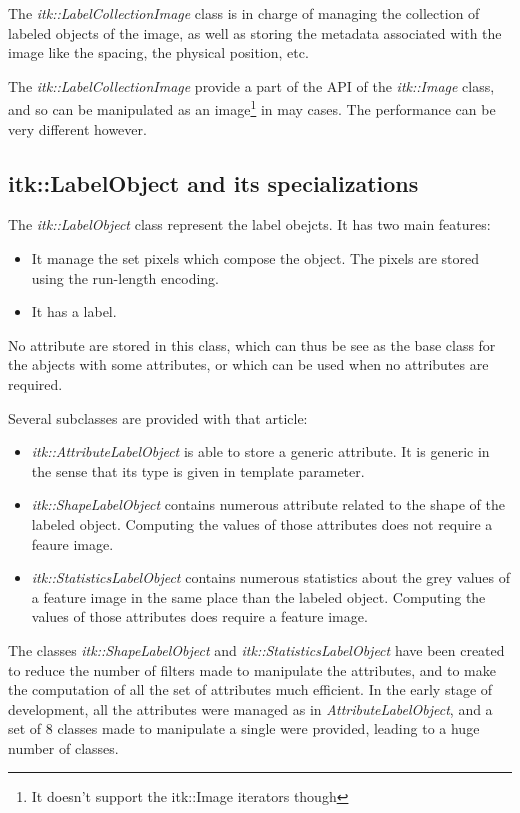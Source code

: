 \documentclass{InsightArticle}
\begin{document}
The {\em itk::LabelCollectionImage} class is in charge of managing the
collection of labeled
objects of the image, as well as storing the metadata associated with the image
like
the spacing, the physical position, etc.

The {\em itk::LabelCollectionImage} provide a part of the API of the {\em
itk::Image} class,
and so can be manipulated as an image\footnote{It doesn't support the itk::Image
iterators though}
in may cases. The performance can be very different however.

\subsection{itk::LabelObject and its specializations}

The {\em itk::LabelObject} class represent the label obejcts. It has two main
features:
\begin{itemize}
  \item It manage the set pixels which compose the object. The pixels are stored
using the run-length encoding.
  \item It has a label.
\end{itemize}

No attribute are stored in this class, which can thus be see as the base class
for the abjects with some attributes, or which can be used when no attributes
are required.

Several subclasses are provided with that article:
\begin{itemize}
  \item {\em itk::AttributeLabelObject} is able to store a generic attribute. It
is generic in the sense that its type is given in template parameter.
  \item {\em itk::ShapeLabelObject} contains numerous attribute related to the
shape of the labeled object. Computing the values of those attributes does not
require a feaure image.
  \item {\em itk::StatisticsLabelObject} contains numerous statistics about the
grey values of a feature image in the same place than the labeled object.
Computing the values of those attributes does require a feature image.
\end{itemize}

The classes {\em itk::ShapeLabelObject} and {\em itk::StatisticsLabelObject} have been
created to reduce the number of filters made to manipulate the attributes, and to make
the computation of all the set of attributes much efficient. In the early stage of
development, all the attributes were managed as in {\em AttributeLabelObject}, and
a set of 8 classes made to manipulate a single were provided, leading to a huge
number of classes.
\end{document}
